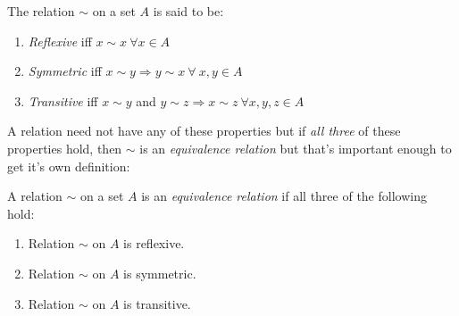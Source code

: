 \begin{definition}
The relation $\sim$ on a set $A$ is said to be:
\begin{enumerate}[label=\roman*)]
    \item \textit{Reflexive} iff $x\sim x \ \forall x \in A$
    \item \textit{Symmetric} iff $x\sim y \Rightarrow y\sim x \ \forall \ x,y \in A$
    \item \textit{Transitive} iff $x\sim y$ and $y\sim z \Rightarrow x\sim z \ \forall x,y,z \in A$
\end{enumerate}
\end{definition}
A relation need not have any of these properties but if \textit{all three} of these properties hold, then $\sim$ is an \textit{equivalence relation} but that's important enough to get it's own definition:
\begin{definition}
A relation $\sim$ on a set $A$ is an \textit{equivalence relation} if all three of the following hold:
\begin{enumerate}[label=\roman*)]
    \item Relation $\sim$ on $A$ is reflexive.
    \item Relation $\sim$ on $A$ is symmetric.
    \item Relation $\sim$ on $A$ is transitive.
\end{enumerate}
\end{definition}
